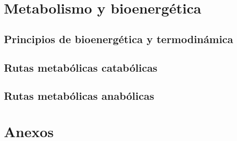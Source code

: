 \documentclass{../summarie}
\begin{document}
\part{Metabolismo y bioenergética}

    \chapter{Principios de bioenergética y termodinámica}
    \chapter{Rutas metabólicas catabólicas}
    \chapter{Rutas metabólicas anabólicas}

\part{Anexos}



\newpage


\end{document}
